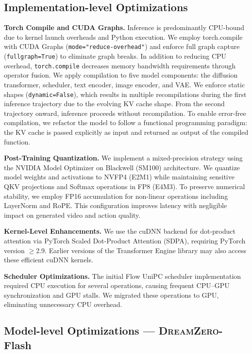 \documentclass[10pt,logo,copyright]{nvidiatechreport}
\newcommand{\ourmethod}{\mbox{\textsc{DreamZero}}\xspace}
\begin{document}
\subsection{Implementation-level Optimizations}
\textbf{Torch Compile and CUDA Graphs.} Inference is predominantly CPU-bound due to kernel launch overheads and Python execution. We employ torch.compile with CUDA Graphs (\texttt{mode="reduce-overhead"}) and enforce full graph capture (\texttt{fullgraph=True}) to eliminate graph breaks. In addition to reducing CPU overhead, \texttt{torch.compile} decreases memory bandwidth requirements through operator fusion. We apply compilation to five model components: the diffusion transformer, scheduler, text encoder, image encoder, and VAE.
We enforce static shapes (\texttt{dynamic=False}), which results in multiple recompilations during the first inference trajectory due to the evolving KV cache shape. From the second trajectory onward, inference proceeds without recompilation. To enable error-free compilation, we refactor the model to follow a functional programming paradigm: the KV cache is passed explicitly as input and returned as output of the compiled function.

\textbf{Post-Training Quantization.} We implement a mixed-precision strategy using the NVIDIA Model Optimizer \citep{nvidia2024modelopt} on Blackwell (SM100) architecture. We quantize model weights and activations to NVFP4 (E2M1) while maintaining sensitive QKV projections and Softmax operations in FP8 (E4M3). To preserve numerical stability, we employ FP16 accumulation for non-linear operations including LayerNorm and RoPE. This configuration improves latency with negligible impact on generated video and action quality.

\textbf{Kernel-Level Enhancements.} We use the cuDNN backend for dot-product attention via PyTorch Scaled Dot-Product Attention (SDPA), requiring PyTorch version $\ge$2.9. Earlier versions of the Transformer Engine library may also access these efficient cuDNN kernels.

\textbf{Scheduler Optimizations.} The initial Flow UniPC scheduler \citep{zhao2023unipc} implementation required CPU execution for several operations, causing frequent CPU–GPU synchronization and GPU stalls. We migrated these operations to GPU, eliminating unnecessary CPU overhead.

\subsection{Model-level Optimizations — \ourmethod-Flash}
\end{document}
